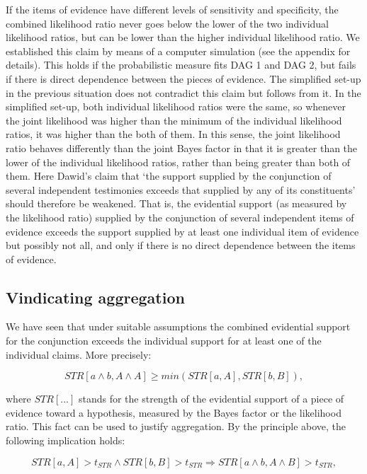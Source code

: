 \documentclass[
  10pt,
  dvipsnames,enabledeprecatedfontcommands]{scrartcl}
\begin{document}
If the items of evidence have different levels of sensitivity and
specificity, the combined likelihood ratio never goes below the lower of
the two individual likelihood ratios, but can be lower than the higher
individual likelihood ratio. We established this claim by means of a
computer simulation (see the appendix for details). This holds if the
probabilistic measure fits \textsf{DAG 1} and \textsf{DAG 2}, but fails
if there is direct dependence between the pieces of evidence. The
simplified set-up in the previous situation does not contradict this
claim but follows from it. In the simplified set-up, both individual
likelihood ratios were the same, so whenever the joint likelihood was
higher than the minimum of the individual likelihood ratios, it was
higher than the both of them. In this sense, the joint likelihood ratio
behaves differently than the joint Bayes factor in that it is greater
than the lower of the individual likelihood ratios, rather than being
greater than both of them. Here Dawid's claim that `the support supplied
by the conjunction of several independent testimonies exceeds that
supplied by any of its constituents' should therefore be weakened. That
is, the evidential support (as measured by the likelihood ratio)
supplied by the conjunction of several independent items of evidence
exceeds the support supplied by at least one individual item of evidence
but possibly not all, and only if there is no direct dependence between
the items of evidence.

\hypertarget{vindicating-aggregation}{%
\subsection{Vindicating aggregation}\label{vindicating-aggregation}}

We have seen that under suitable assumptions the combined evidential
support for the conjunction exceeds the individual support for at least
one of the individual claims. More precisely:

\[STR[a \wedge b, A\wedge A] \geq min(STR[a, A], STR[b, B]),\]

\noindent where \(STR[...]\) stands for the strength of the evidential
support of a piece of evidence toward a hypothesis, measured by the
Bayes factor or the likelihood ratio. This fact can be used to justify
aggregation. By the principle above, the following implication holds:

\[STR[a, A]>t_{STR} \wedge STR[b, B]>t_{STR} \Rightarrow  STR[a \wedge b, A\wedge B]>t_{STR},\]
\end{document}
